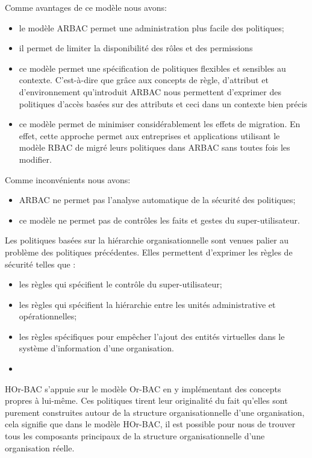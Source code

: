 \label{sectionAvantageARBAC}

Comme avantages de ce modèle nous avons: 
\begin{itemize}
\item le modèle ARBAC permet une administration plus facile des politiques;
\item il permet de limiter la disponibilité des rôles et des permissions
\item ce modèle permet une spécification de politiques flexibles et sensibles au contexte. C'est-à-dire que grâce aux concepts de règle, d'attribut et d'environnement qu'introduit ARBAC nous permettent d'exprimer des politiques d'accès basées sur des attributs et ceci dans un contexte bien précis
\item ce modèle permet de minimiser considérablement les effets de migration. En effet, cette approche permet aux entreprises et applications utilisant le modèle RBAC de migré leurs politiques dans ARBAC sans toutes fois les modifier.
\end{itemize}

\label{sectionInconvenientARBAC}

Comme inconvénients nous avons: 

\begin{itemize}
\item ARBAC ne permet pas l'analyse automatique de la sécurité des politiques;
\item ce modèle ne permet pas de contrôles les faits et gestes du super-utilisateur.
\end{itemize}
 
\label{sectionHOrRBAC}

Les politiques basées sur la hiérarchie organisationnelle sont venues palier au problème des politiques précédentes. Elles permettent d'exprimer les règles de sécurité telles que \cite{theseBenoit} : 
\begin{itemize}
\item les règles qui spécifient le contrôle du super-utilisateur;
\item les règles qui spécifient la hiérarchie entre les unités administrative et opérationnelles;
\item les règles spécifiques pour empêcher l'ajout des entités virtuelles dans le système d'information d'une organisation.
\item
\end{itemize}
\hspace*{0.5cm} HOr-BAC s'appuie sur le modèle Or-BAC en y implémentant des concepts propres à lui-même. Ces politiques tirent leur originalité du fait qu'elles sont purement construites autour de la structure organisationnelle d'une organisation, cela signifie que dans le modèle HOr-BAC, il est possible pour nous de trouver tous les composants principaux de la structure organisationnelle d'une organisation réelle.

